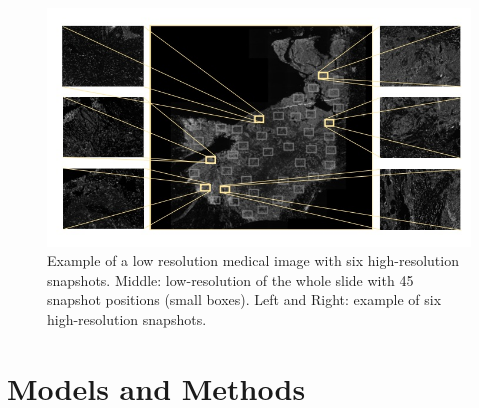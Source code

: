 \documentclass[11pt,conference,compsocconf]{IEEEtran}
\begin{document}
 \begin{figure}[tbp]
  \centering
  \includegraphics[width=\columnwidth]{doc/report/images/scan1.jpg}
  \caption{Example of a low resolution medical image with six high-resolution
snapshots. Middle: low-resolution of the whole slide with 45 snapshot positions
(small boxes). Left and Right: example of six high-resolution snapshots.}
  \vspace{-3mm}
  \label{fig:phenotypes}
\end{figure}


\section{Models and Methods}\label{sec:models-methods}
\end{document}
